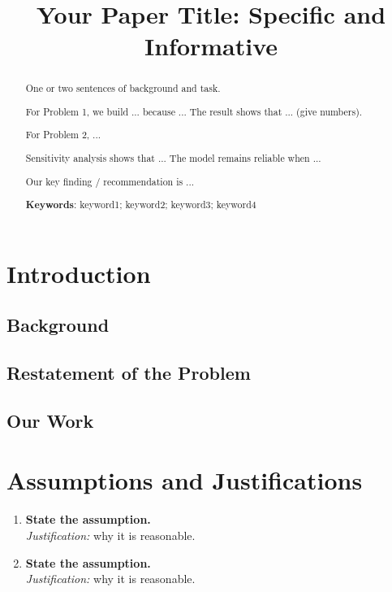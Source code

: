 \documentclass[12pt]{article}
\title{Your Paper Title: Specific and Informative}
\begin{document}
\begin{abstract}
One or two sentences of background and task.

For Problem 1, we build ... because ... The result shows that ... (give numbers).

For Problem 2, ...

Sensitivity analysis shows that ... The model remains reliable when ...

Our key finding / recommendation is ...

\vspace{5pt}
\textbf{Keywords}: keyword1; keyword2; keyword3; keyword4
\end{abstract}
\maketitle

\tableofcontents

\section{Introduction}
\subsection{Background}
\subsection{Restatement of the Problem}
\subsection{Our Work}

\section{Assumptions and Justifications}
\begin{enumerate}[label=\textbf{Assumption \arabic*:}, leftmargin=*, itemsep=4pt]
    \item \textbf{State the assumption.}\\
          \textit{Justification:} why it is reasonable.
    \item \textbf{State the assumption.}\\
          \textit{Justification:} why it is reasonable.
\end{enumerate}
\end{document}
